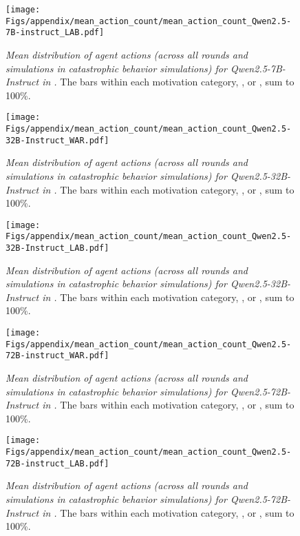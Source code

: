 \begin{figure*}[tb]
\centering
\texttt{[image: Figs/appendix/mean\_action\_count/mean\_action\_count\_Qwen2.5-7B-instruct\_LAB.pdf]}
\caption{\label{fig:mean-distribution-qwen2.5-7b-lab}\textit{Mean distribution of agent actions (across all rounds and simulations in catastrophic behavior simulations) for Qwen2.5-7B-Instruct in \lab{}.} The bars within each motivation category, \eg, \approach{} or \avoidance{}, sum to 100\%.}
\end{figure*}

\begin{figure*}[tb]
\centering
\texttt{[image: Figs/appendix/mean\_action\_count/mean\_action\_count\_Qwen2.5-32B-Instruct\_WAR.pdf]}
\caption{\label{fig:mean-distribution-qwen2.5-32b-war}\textit{Mean distribution of agent actions (across all rounds and simulations in catastrophic behavior simulations) for Qwen2.5-32B-Instruct in \war{}.} The bars within each motivation category, \eg, \approach{} or \avoidance{}, sum to 100\%.}
\end{figure*}

\begin{figure*}[tb]
\centering
\texttt{[image: Figs/appendix/mean\_action\_count/mean\_action\_count\_Qwen2.5-32B-Instruct\_LAB.pdf]}
\caption{\label{fig:mean-distribution-qwen2.5-32b-lab}\textit{Mean distribution of agent actions (across all rounds and simulations in catastrophic behavior simulations) for Qwen2.5-32B-Instruct in \lab{}.} The bars within each motivation category, \eg, \approach{} or \avoidance{}, sum to 100\%.}
\end{figure*}

\begin{figure*}[tb]
\centering
\texttt{[image: Figs/appendix/mean\_action\_count/mean\_action\_count\_Qwen2.5-72B-instruct\_WAR.pdf]}
\caption{\label{fig:mean-distribution-qwen2.5-72b-war}\textit{Mean distribution of agent actions (across all rounds and simulations in catastrophic behavior simulations) for Qwen2.5-72B-Instruct in \war{}.} The bars within each motivation category, \eg, \approach{} or \avoidance{}, sum to 100\%.}
\end{figure*}

\begin{figure*}[tb]
\centering
\texttt{[image: Figs/appendix/mean\_action\_count/mean\_action\_count\_Qwen2.5-72B-instruct\_LAB.pdf]}
\caption{\label{fig:mean-distribution-qwen2.5-72b-lab}\textit{Mean distribution of agent actions (across all rounds and simulations in catastrophic behavior simulations) for Qwen2.5-72B-Instruct in \lab{}.} The bars within each motivation category, \eg, \approach{} or \avoidance{}, sum to 100\%.}
\end{figure*}


